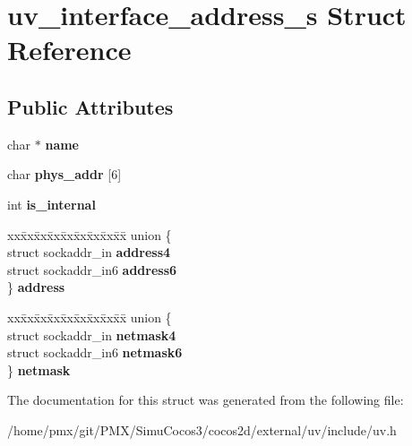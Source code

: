 \hypertarget{structuv__interface__address__s}{}\section{uv\+\_\+interface\+\_\+address\+\_\+s Struct Reference}
\label{structuv__interface__address__s}
\subsection*{Public Attributes}
\begin{DoxyCompactItemize}
\item 
\mbox{\label{structuv__interface__address__s_a9b4e93684853f3ea6ebacc44411531a2}} 
char $\ast$ {\bfseries name}
\item 
\mbox{\label{structuv__interface__address__s_aeb88e665e814bbbd20672024dc5e2ca5}} 
char {\bfseries phys\+\_\+addr} \mbox{[}6\mbox{]}
\item 
\mbox{\label{structuv__interface__address__s_a16df2975361a9cf24d6bd5d6b6cb9624}} 
int {\bfseries is\+\_\+internal}
\item 
\mbox{\label{structuv__interface__address__s_a3aaf5133ed71dbedd972b228050d1476}} 
\begin{tabbing}
xx\=xx\=xx\=xx\=xx\=xx\=xx\=xx\=xx\=\kill
union \{\\
\>struct sockaddr\_in {\bfseries address4}\\
\>struct sockaddr\_in6 {\bfseries address6}\\
\} {\bfseries address}\\

\end{tabbing}\item 
\mbox{\label{structuv__interface__address__s_a9d34599f3fe4b7f73a5559e90dc12dd1}} 
\begin{tabbing}
xx\=xx\=xx\=xx\=xx\=xx\=xx\=xx\=xx\=\kill
union \{\\
\>struct sockaddr\_in {\bfseries netmask4}\\
\>struct sockaddr\_in6 {\bfseries netmask6}\\
\} {\bfseries netmask}\\

\end{tabbing}\end{DoxyCompactItemize}


The documentation for this struct was generated from the following file\+:\begin{DoxyCompactItemize}
\item 
/home/pmx/git/\+P\+M\+X/\+Simu\+Cocos3/cocos2d/external/uv/include/uv.\+h\end{DoxyCompactItemize}
